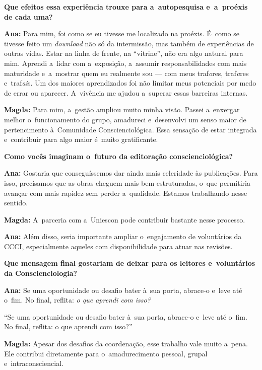 \documentclass{gescons}
\begin{document}
\begin{multicols}{2}
\textbf{Que efeitos essa experiência trouxe para a~autopesquisa e~a~proéxis de cada uma?}

\textbf{Ana:} Para mim, foi como se eu tivesse me localizado na proéxis. É~como se tivesse feito um \emph{download} não só da intermissão, mas também de experiências de outras vidas. Estar na linha de frente, na ``vitrine'', não era algo natural para mim. Aprendi a~lidar com a~exposição, a~assumir responsabilidades com mais maturidade e~a~mostrar quem eu realmente sou --- com meus traf\emph{o}res, traf\emph{a}res e~traf\emph{ai}s. Um dos maiores aprendizados foi não limitar meus potenciais por medo de errar ou aparecer. A~vivência me ajudou a~superar essas barreiras internas.

\textbf{Magda:} Para mim, a~gestão ampliou muito minha visão. Passei a~enxergar melhor o~funcionamento do grupo, amadureci e~desenvolvi um senso maior de pertencimento à~Comunidade Conscienciológica. Essa sensação de estar integrada e~contribuir para algo maior é~muito gratificante.

\textbf{Como vocês imaginam o~futuro da editoração conscienciológica?}

\textbf{Ana:} Gostaria que conseguíssemos dar ainda mais celeridade às publicações. Para isso, precisamos que as obras cheguem mais bem estruturadas, o~que permitiria avançar com mais rapidez sem perder a~qualidade. Estamos trabalhando nesse sentido.

\textbf{Magda:} A~parceria com a~Uniescon pode contribuir bastante nesse processo.

\textbf{Ana:} Além disso, seria importante ampliar o~engajamento de voluntários da CCCI, especialmente aqueles com disponibilidade para atuar nas revisões.

\textbf{Que mensagem final gostariam de deixar para os leitores e~voluntários da Conscienciologia?}

\textbf{Ana:} Se uma oportunidade ou desafio bater à~sua porta, abrace-o e~leve até o~fim. No final, reflita: \emph{o que aprendi com isso?}

\begin{pullquote}
``Se uma oportunidade ou desafio bater à~sua porta, abrace-o e~leve até o~fim. No final, reflita: o que aprendi com isso?''
\end{pullquote}

\textbf{Magda:} Apesar dos desafios da coordenação, esse trabalho vale muito a~pena. Ele contribui diretamente para o~amadurecimento pessoal, grupal e~intraconsciencial.


\end{multicols}
\end{document}
